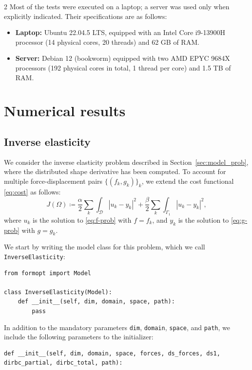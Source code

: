 \documentclass[a4paper, oneside]{article}
\newcommand{\code}[1]{\texttt{#1}}
\begin{document}
\begin{multicols}{2}
Most of the tests were executed on a laptop; a server was used only when explicitly indicated.
Their specifications are as follows:
\begin{itemize}[left=0.0em]
\item \textbf{Laptop:} Ubuntu 22.04.5 LTS, equipped with an Intel Core i9-13900H
processor (14 physical cores, 20 threads) and 62 GB of RAM.
\item \textbf{Server:} Debian 12 (bookworm) equipped with two AMD EPYC 9684X
processors (192 physical cores in total, 1 thread per core) and 1.5 TB of RAM.
\end{itemize}

\section{Numerical results}\label{sec:results}

\subsection{Inverse elasticity}\label{sec:num_inverse_elasticity}

We consider the inverse elasticity problem described in Section~\ref{sec:model_prob},
where the distributed shape derivative has been computed.
To account for multiple force-displacement pairs $\{(f_k, g_k)\}_k$,
we extend the cost functional \eqref{eq:cost} as follows:
\begin{equation}
	J(\Omega)\coloneqq
	\frac{\alpha}{2}\sum_{k}\int_{\mathcal{D}}|u_{k}-y_{k}|^{2}+
	\frac{\beta}{2}\sum_{k}\int_{\Gamma_{1}}|u_{k}-y_{k}|^{2},
\end{equation}
where $u_k$ is the solution to \eqref{eq:f-prob} with $f=f_k$,
and $y_k$ is the solution to \eqref{eq:g-prob} with $g=g_k$.

We start by writing the model class for this problem,
which we call \code{InverseElasticity}:
\begin{lstlisting}
from formopt import Model

class InverseElasticity(Model):
	def __init__(self, dim, domain, space, path):
		pass
\end{lstlisting}
In addition to the mandatory parameters
\code{dim}, \code{domain}, \code{space}, and \code{path},
we include the following parameters to the initializer:
\begin{lstlisting}
def __init__(self, dim, domain, space, forces, ds_forces, ds1, dirbc_partial, dirbc_total, path):
\end{lstlisting}


\end{multicols}
\end{document}
